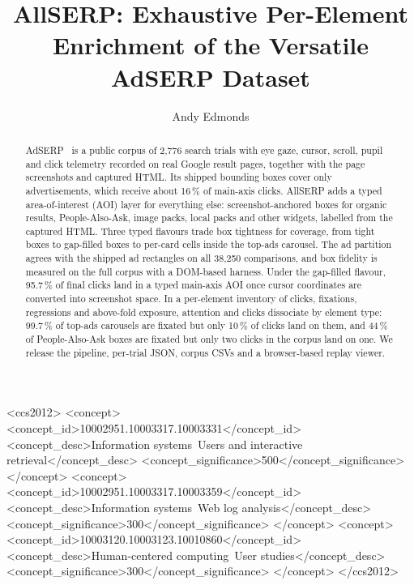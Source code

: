 \documentclass[sigconf,authorversion,natbib=true]{acmart}
\begin{document}
\title[AllSERP]{AllSERP: Exhaustive Per-Element Enrichment of the Versatile AdSERP Dataset}

\author{Andy Edmonds}
\affiliation{%
  \institution{}
  \city{}
  \country{}
}

\renewcommand{\shortauthors}{Edmonds}

\begin{abstract}
AdSERP~\cite{latifzadeh2025adserp} is a public corpus of 2,776 search trials with eye gaze, cursor, scroll, pupil and click telemetry recorded on real Google result pages, together with the page screenshots and captured HTML. Its shipped bounding boxes cover only advertisements, which receive about 16\,\% of main-axis clicks. AllSERP adds a typed area-of-interest (AOI) layer for everything else: screenshot-anchored boxes for organic results, People-Also-Ask, image packs, local packs and other widgets, labelled from the captured HTML. Three typed flavours trade box tightness for coverage, from tight boxes to gap-filled boxes to per-card cells inside the top-ads carousel. The ad partition agrees with the shipped ad rectangles on all 38,250 comparisons, and box fidelity is measured on the full corpus with a DOM-based harness. Under the gap-filled flavour, 95.7\,\% of final clicks land in a typed main-axis AOI once cursor coordinates are converted into screenshot space. In a per-element inventory of clicks, fixations, regressions and above-fold exposure, attention and clicks dissociate by element type: 99.7\,\% of top-ads carousels are fixated but only 10\,\% of clicks land on them, and 44\,\% of People-Also-Ask boxes are fixated but only two clicks in the corpus land on one. We release the pipeline, per-trial JSON, corpus CSVs and a browser-based replay viewer.
\end{abstract}

\begin{CCSXML}
<ccs2012>
   <concept>
       <concept_id>10002951.10003317.10003331</concept_id>
       <concept_desc>Information systems~Users and interactive retrieval</concept_desc>
       <concept_significance>500</concept_significance>
       </concept>
   <concept>
       <concept_id>10002951.10003317.10003359</concept_id>
       <concept_desc>Information systems~Web log analysis</concept_desc>
       <concept_significance>300</concept_significance>
       </concept>
   <concept>
       <concept_id>10003120.10003123.10010860</concept_id>
       <concept_desc>Human-centered computing~User studies</concept_desc>
       <concept_significance>300</concept_significance>
       </concept>
 </ccs2012>
\end{CCSXML}
\end{document}

